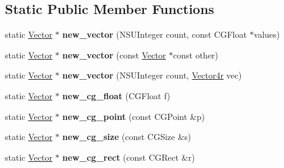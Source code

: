 \subsection*{Static Public Member Functions}
\begin{DoxyCompactItemize}
\item 
\mbox{\label{class_p_o_p_1_1_vector_a9d9831a6b1c29abf8474c199af3e8e62}} 
static \mbox{\hyperlink{class_p_o_p_1_1_vector}{Vector}} $\ast$ {\bfseries new\+\_\+vector} (N\+S\+U\+Integer count, const C\+G\+Float $\ast$values)
\item 
\mbox{\label{class_p_o_p_1_1_vector_aff7d4bee00f01244be496fba1c32336d}} 
static \mbox{\hyperlink{class_p_o_p_1_1_vector}{Vector}} $\ast$ {\bfseries new\+\_\+vector} (const \mbox{\hyperlink{class_p_o_p_1_1_vector}{Vector}} $\ast$const other)
\item 
\mbox{\label{class_p_o_p_1_1_vector_adbd0e6ab1a063a9a97f0b2b22f08ebfb}} 
static \mbox{\hyperlink{class_p_o_p_1_1_vector}{Vector}} $\ast$ {\bfseries new\+\_\+vector} (N\+S\+U\+Integer count, \mbox{\hyperlink{struct_p_o_p_1_1_vector4}{Vector4r}} vec)
\item 
\mbox{\label{class_p_o_p_1_1_vector_abd83875b4b4ff0d67a3f7c6fc58a4ccd}} 
static \mbox{\hyperlink{class_p_o_p_1_1_vector}{Vector}} $\ast$ {\bfseries new\+\_\+cg\+\_\+float} (C\+G\+Float f)
\item 
\mbox{\label{class_p_o_p_1_1_vector_aab67b7e219bfb7487482d7748515064c}} 
static \mbox{\hyperlink{class_p_o_p_1_1_vector}{Vector}} $\ast$ {\bfseries new\+\_\+cg\+\_\+point} (const C\+G\+Point \&p)
\item 
\mbox{\label{class_p_o_p_1_1_vector_a19065d56554f9fdce3bfc7626233aa6b}} 
static \mbox{\hyperlink{class_p_o_p_1_1_vector}{Vector}} $\ast$ {\bfseries new\+\_\+cg\+\_\+size} (const C\+G\+Size \&s)
\item 
\mbox{\label{class_p_o_p_1_1_vector_af6e694a3bcb58498b321cb30c4c45699}} 
static \mbox{\hyperlink{class_p_o_p_1_1_vector}{Vector}} $\ast$ {\bfseries new\+\_\+cg\+\_\+rect} (const C\+G\+Rect \&r)
\item 

\end{DoxyCompactItemize}
